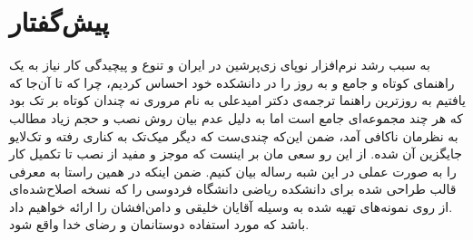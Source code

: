 \chapter*{پیش‌گفتار}
به سبب رشد نرم‌افزار نوپای زی‌پرشین در ایران و تنوع و پیچیدگی کار نیاز به یک راهنمای کوتاه و جامع و به روز را در دانشکده خود احساس کردیم، چرا که تا آن‌جا که یافتیم به روزترین راهنما ترجمه‌ی دکتر امیدعلی به نام مروری نه چندان کوتاه بر تک بود که هر چند مجموعه‌ای جامع است اما به دلیل عدم بیان روش نصب و حجم زیاد مطالب به نظرمان ناکافی آمد، ضمن این‌که چندی‌ست که دیگر میک‌تک به کناری رفته و تک‌لایو جایگزین آن شده. از این رو سعی مان بر اینست که موجز و مفید از نصب تا تکمیل کار را به صورت عملی در این شبه رساله بیان کنیم. ضمن اینکه در همین راستا به معرفی قالب طراحی شده برای دانشکده ریاضی دانشگاه فردوسی را که نسخه اصلاح‌شده‌ای از روی نمونه‌های تهیه شده به وسیله آقایان خلیقی و دامن‌افشان را ارائه خواهیم داد.\\
باشد که مورد استفاده دوستانمان و رضای خدا واقع شود.